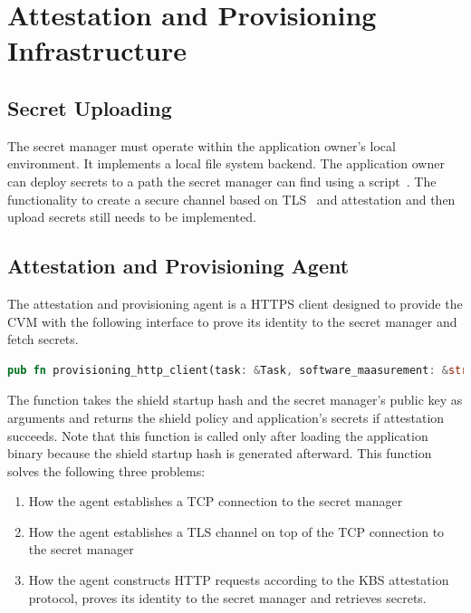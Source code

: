 \section{Attestation and Provisioning Infrastructure}
\label{sec:impl_attestation_infr}

\subsection{Secret Uploading}
The secret manager must operate within the application owner's local environment. It implements a local file system backend. The application owner can deploy secrets to a path the secret manager can find using a script~\cite*{secret_uploading_script}. The functionality to create a secure channel 
based on TLS~\cite*{tls_record_size} and attestation and then upload secrets still needs to be implemented.

\subsection{Attestation and Provisioning Agent}
The attestation and provisioning agent is a HTTPS client designed to provide the \acrshort{CVM} with the following interface to prove its identity to the secret manager and fetch secrets.

\begin{lstlisting}[language=rust, caption= API of the atestation and provisioning agent]
    pub fn provisioning_http_client(task: &Task, software_maasurement: &str, sm_cert: Vec<u8>) -> Result<(KbsPolicy, KbsSecrets)>
\end{lstlisting}

The function takes the shield startup hash and the secret manager’s public key as arguments and returns the shield policy and application’s secrets if attestation succeeds. Note that this function is called only after loading the application binary because the shield startup hash is 
generated afterward. This function solves the following three problems:

\begin{enumerate}
    \item How the agent establishes a TCP connection to the secret manager
    \item How the agent establishes a TLS channel on top of the TCP connection to the secret manager
    \item How the agent constructs HTTP requests according to the KBS attestation protocol, proves its identity to the secret manager and retrieves secrets.
\end{enumerate}


